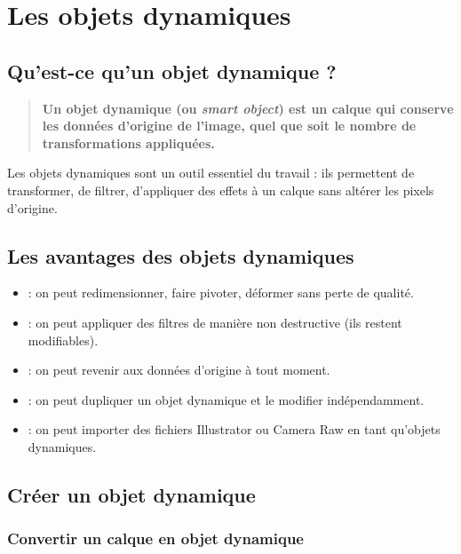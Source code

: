 \section{Les objets dynamiques}

\subsection{Qu'est-ce qu'un objet dynamique ?}

\begin{quote}
\textbf{Un objet dynamique (ou \emph{smart object}) est un calque qui conserve les données d'origine de l'image, quel que soit le nombre de transformations appliquées.}
\end{quote}

Les objets dynamiques sont un outil essentiel du travail  : ils permettent de transformer, de filtrer, d'appliquer des effets à un calque sans altérer les pixels d'origine.

\subsection{Les avantages des objets dynamiques}

\begin{itemize}
    \item {} : on peut redimensionner, faire pivoter, déformer sans perte de qualité.
    \item {} : on peut appliquer des filtres de manière non destructive (ils restent modifiables).
    \item {} : on peut revenir aux données d'origine à tout moment.
    \item {} : on peut dupliquer un objet dynamique et le modifier indépendamment.
    \item {} : on peut importer des fichiers Illustrator ou Camera Raw en tant qu'objets dynamiques.
\end{itemize}

\subsection{Créer un objet dynamique}

\subsubsection{Convertir un calque en objet dynamique}

